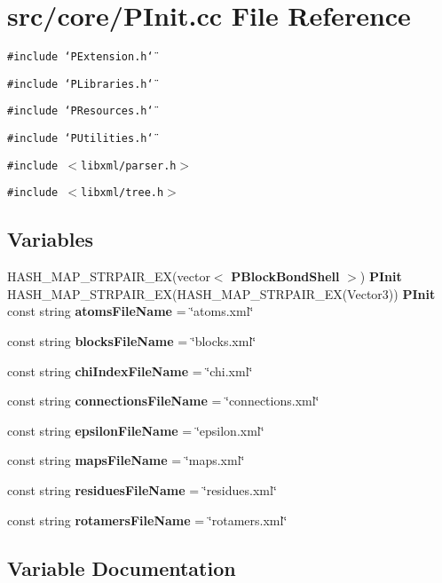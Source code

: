 \section{src/core/PInit.cc File Reference}
\label{PInit_8cc}


{\tt \#include \char`\"{}PExtension.h\char`\"{}}\par
{\tt \#include \char`\"{}PLibraries.h\char`\"{}}\par
{\tt \#include \char`\"{}PResources.h\char`\"{}}\par
{\tt \#include \char`\"{}PUtilities.h\char`\"{}}\par
{\tt \#include $<$libxml/parser.h$>$}\par
{\tt \#include $<$libxml/tree.h$>$}\par
\subsection*{Variables}
\begin{CompactItemize}
\item 
HASH\_\-MAP\_\-STRPAIR\_\-EX(vector$<$ {\bf PBlock\-Bond\-Shell} $>$) {\bf PInit} HASH\_\-MAP\_\-STRPAIR\_\-EX(HASH\_\-MAP\_\-STRPAIR\_\-EX(Vector3)) {\bf PInit} const string {\bf atoms\-File\-Name} = \char`\"{}atoms.xml\char`\"{}
\item 
const string {\bf blocks\-File\-Name} = \char`\"{}blocks.xml\char`\"{}
\item 
const string {\bf chi\-Index\-File\-Name} = \char`\"{}chi.xml\char`\"{}
\item 
const string {\bf connections\-File\-Name} = \char`\"{}connections.xml\char`\"{}
\item 
const string {\bf epsilon\-File\-Name} = \char`\"{}epsilon.xml\char`\"{}
\item 
const string {\bf maps\-File\-Name} = \char`\"{}maps.xml\char`\"{}
\item 
const string {\bf residues\-File\-Name} = \char`\"{}residues.xml\char`\"{}
\item 
const string {\bf rotamers\-File\-Name} = \char`\"{}rotamers.xml\char`\"{}
\end{CompactItemize}


\subsection{Variable Documentation}
